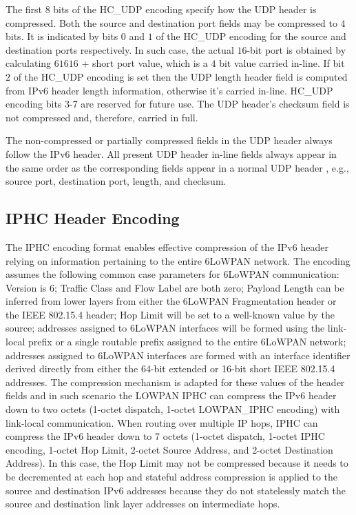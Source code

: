 \documentclass[12pt, titlepage, a4paper]{report}
\begin{document}
The first $8$ bits of the HC\_UDP encoding specify how the UDP header is compressed. Both the source and destination port fields may be compressed to $4$ bits. It is indicated by bits $0$ and $1$ of the HC\_UDP encoding for the source and destination ports respectively. In such case, the actual $16$-bit port is obtained by calculating $61616$ + short port value, which is a $4$ bit value carried in-line. If bit $2$ of the HC\_UDP encoding is set then the UDP length header field is computed from IPv6 header length information, otherwise it's carried in-line. HC\_UDP encoding bits 3-7 are reserved for future use. The UDP header's checksum field is not compressed and, therefore, carried in full.

The non-compressed or partially compressed fields in the UDP header always follow the IPv6 header. All present UDP header in-line fields always appear in the same order as the corresponding fields appear in a normal UDP header \cite{rfc780}, e.g., source port, destination port, length, and checksum.

\subsection{IPHC Header Encoding}
The IPHC encoding format enables effective compression of the IPv6 header relying on information pertaining to the entire 6LoWPAN network. The encoding assumes the following common case parameters for 6LoWPAN communication: Version is $6$; Traffic Class and Flow Label are both zero; Payload Length can be inferred from lower layers from either the 6LoWPAN Fragmentation header or the IEEE 802.15.4 header; Hop Limit will be set to a well-known value by the source; addresses assigned to 6LoWPAN interfaces will be formed using the link-local prefix or a single routable prefix assigned to the entire 6LoWPAN network; addresses assigned to 6LoWPAN interfaces are formed with an interface identifier derived directly from either the 64-bit extended or 16-bit short IEEE 802.15.4 addresses. The compression mechanism is adapted for these values of the header fields and in such scenario the LOWPAN IPHC can compress the IPv6 header down to two octets (1-octet dispatch, 1-octet LOWPAN\_IPHC encoding) with link-local communication.  When routing over multiple IP hops, IPHC can compress the IPv6 header down to 7 octets (1-octet dispatch, 1-octet IPHC encoding, 1-octet Hop Limit, 2-octet Source Address, and 2-octet Destination Address).  In this case, the Hop Limit may not be compressed because it needs to be decremented at each hop and stateful address compression is applied to the source and destination IPv6 addresses because they do not statelessly match the source and destination link layer addresses on intermediate hops.
\end{document}
